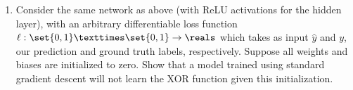 \begin{enumerate}
{\[            b_1 = \begin{bmatrix}
                0 \\ 0
            \end{bmatrix}
            W_2 = \begin{bmatrix}
                1 & -1
            \end{bmatrix}
            b_2 = 0
        \]
        Doing the respective calculations we get the following
        \[
            \text{ReLU}(W \cdot \mathbf{\begin{bmatrix}
                0 \\ 0
            \end{bmatrix}} +b) = 0
        \]
        \[
            \text{ReLU}(W \cdot \mathbf{\begin{bmatrix}
                0 \\ 1
            \end{bmatrix}} +b) = 1
        \]
        \[
            \text{ReLU}(W \cdot \mathbf{\begin{bmatrix}
                1 \\ 0
            \end{bmatrix}} +b) = 1
        \]
        \[
            \text{ReLU}(W \cdot \mathbf{\begin{bmatrix}
                1 \\ 1
            \end{bmatrix}} +b) = 0
        \]
    }
    \item Consider the same network as above (with ReLU activations for the hidden layer), with an arbitrary differentiable loss function $\ell : \set{0, 1} × \set{0, 1} \rightarrow \reals$ which takes as input $\hat{y}$ and $y$, our prediction and ground truth labels, respectively. 
    Suppose all weights and biases are initialized to zero. 
    Show that a model trained using standard gradient descent will not learn the XOR function given this initialization.\\
  
\end{enumerate}

\clearpage

